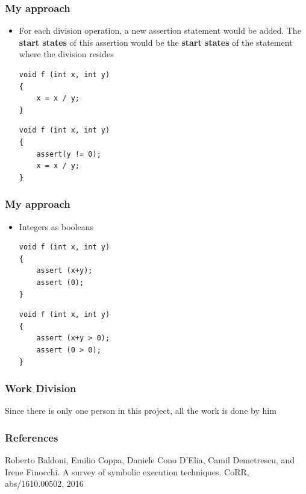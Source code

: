 \documentclass{beamer}
\begin{document}
\begin{frame}[fragile]
\frametitle{My approach}
\begin{itemize}

\item For each division operation, a new assertion statement would be added. The \textbf{start states} of this assertion would be the \textbf{start states} of the statement where the division resides

\begin{lstlisting}  
void f (int x, int y) 
{
	x = x / y;
}
\end{lstlisting}

\begin{lstlisting}  
void f (int x, int y) 
{
	assert(y != 0);
	x = x / y;
}
\end{lstlisting}

\end{itemize}
\end{frame}


\begin{frame}[fragile]
\frametitle{My approach}
\begin{itemize}

\item Integers as booleans

\begin{lstlisting}  
void f (int x, int y) 
{ 	
	assert (x+y);
	assert (0);
}
\end{lstlisting}

\begin{lstlisting}  
void f (int x, int y) 
{ 	
	assert (x+y > 0);
	assert (0 > 0);
}
\end{lstlisting}

\end{itemize}
\end{frame}



\begin{frame}[fragile]
\frametitle{Work Division}
Since there is only one person in this project, all the work is done by him
\end{frame}

\begin{frame}[fragile]
\frametitle{References}
Roberto Baldoni, Emilio Coppa, Daniele Cono D’Elia, Camil Demetrescu, and Irene Finocchi.
A survey of symbolic execution techniques. CoRR, abs/1610.00502, 2016
\end{frame}
\end{document}
